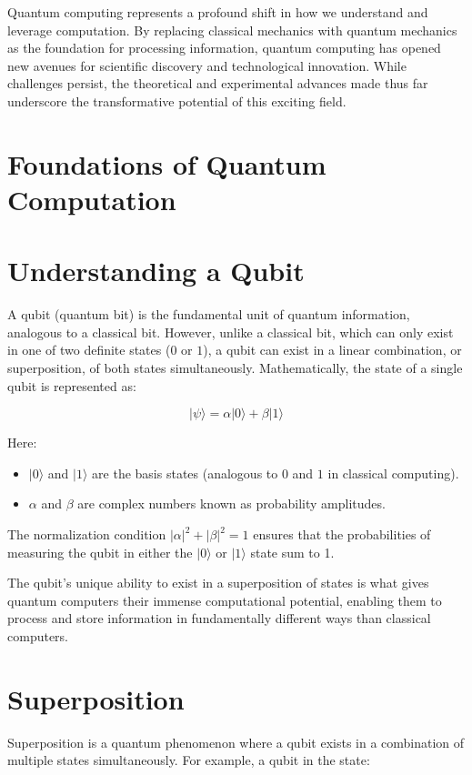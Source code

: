 \documentclass[11pt]{article}
\theoremstyle{definition}
\begin{document}
Quantum computing represents a profound shift in how we understand and leverage computation. By replacing classical mechanics with quantum mechanics as the foundation for processing information, quantum computing has opened new avenues for scientific discovery and technological innovation. While challenges persist, the theoretical and experimental advances made thus far underscore the transformative potential of this exciting field.


\section*{Foundations of Quantum Computation}



\section*{Understanding a Qubit}
A qubit (quantum bit) is the fundamental unit of quantum information, analogous to a classical bit. However, unlike a classical bit, which can only exist in one of two definite states ($0$ or $1$), a qubit can exist in a linear combination, or superposition, of both states simultaneously. Mathematically, the state of a single qubit is represented as:

\begin{equation}
|\psi\rangle = \alpha |0\rangle + \beta |1\rangle
\end{equation}

Here:
\begin{itemize}
    \item $|0\rangle$ and $|1\rangle$ are the basis states (analogous to $0$ and $1$ in classical computing).
    \item $\alpha$ and $\beta$ are complex numbers known as probability amplitudes.
\end{itemize}

The normalization condition \(|\alpha|^2 + |\beta|^2 = 1\) ensures that the probabilities of measuring the qubit in either the $|0\rangle$ or $|1\rangle$ state sum to 1.

The qubit's unique ability to exist in a superposition of states is what gives quantum computers their immense computational potential, enabling them to process and store information in fundamentally different ways than classical computers.

\section*{Superposition}
Superposition is a quantum phenomenon where a qubit exists in a combination of multiple states simultaneously. For example, a qubit in the state:
\end{document}
